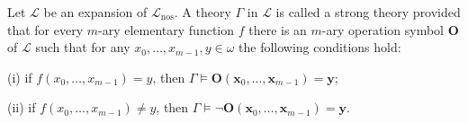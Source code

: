 Let $\mathcal{L}$ be an expansion of $\mathcal{L}_{\text{nos}}$. A theory $\Gamma$ in $\mathcal{L}$ is called a strong theory provided that for every $m$-ary elementary function $f$ there is an $m$-ary operation symbol $\mathbf{O}$ of $\mathcal{L}$ such that for any $x_0, \ldots, x_{m-1}, y \in \omega$ the following conditions hold:

(i) if $f(x_0, \ldots, x_{m-1}) = y$, then $\Gamma \models \mathbf{O}(\mathbf{x}_0, \ldots, \mathbf{x}_{m-1}) = \mathbf{y}$;

(ii) if $f(x_0, \ldots, x_{m-1}) \neq y$, then $\Gamma \models \neg \mathbf{O}(\mathbf{x}_0, \ldots, \mathbf{x}_{m-1}) = \mathbf{y}$.
